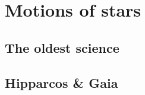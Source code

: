 \chapter{Motions of stars}\label{chap:motions}

\section{The oldest science}\label{sec:oldest}

\section{Hipparcos \& Gaia}\label{sec:gaia}